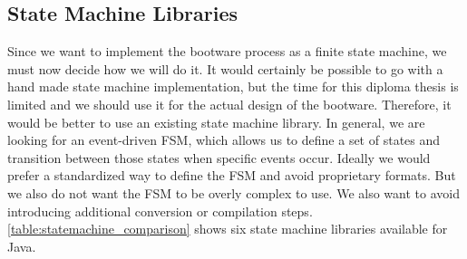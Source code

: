\subsection{State Machine Libraries}
\label{implementation:selecting:statemachine}

Since we want to implement the bootware process as a finite state machine, we must now decide how we will do it.
It would certainly be possible to go with a hand made state machine implementation, but the time for this diploma thesis is limited and we should use it for the actual design of the bootware.
Therefore, it would be better to use an existing state machine library.
In general, we are looking for an event-driven FSM, which allows us to define a set of states and transition between those states when specific events occur.
Ideally we would prefer a standardized way to define the FSM and avoid proprietary formats.
But we also do not want the FSM to be overly complex to use.
We also want to avoid introducing additional conversion or compilation steps.
\autoref{table:statemachine_comparison} shows six state machine libraries available for Java.

